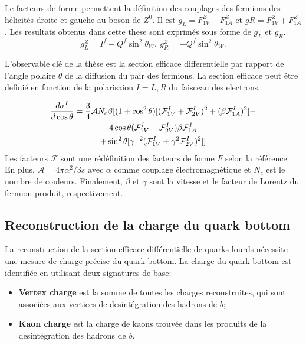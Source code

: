 Le facteurs de forme permettent la définition des couplages des fermions des hélicités droite et gauche au boson de $Z^0$. Il est $g_L = F^Z_{1V} - F^Z_{1A}$  et $gR = F^Z_{1V} + F^Z_{1A}$.
Les resultats obtenus dans cette these sont exprimés sous forme de $g_L$ et $g_R$.  
\begin{equation}
g_L^Z = I^f - Q^f\sin^2\theta_W, \  g_R^Z = -Q^f\sin^2\theta_W.
\label{formula:EWcouplings_3F}
\end{equation}

L'observable clé de la thèse est la section efficace differentielle par rapport de l'angle polaire $\theta$ de la diffusion du pair des fermions. La section efficace peut être definié en fonction de la polarisaion $I=L, R$ du faisceau des electrons.    

\begin{multline}
\label{formula:DiffSigma_3F}
\frac{d\sigma^I}{d\cos\theta} = \frac{3}{4} \mathcal{A} N_c \beta[ (1+\cos^2\theta) [(\mathcal{F}^I_{1V}+\mathcal{F}^I_{2V})^2+(\beta \mathcal{F}^I_{1A})^2] - \\-4 \cos\theta (\mathcal{F}^I_{1V}+\mathcal{F}^I_{2V})\beta \mathcal{F}^I_{1A} +\\+ \sin^2\theta [\gamma ^{-2} (\mathcal{F}^I_{1V} +\gamma^2 \mathcal{F}^I_{2V})^2] ]
\end{multline}
Les facteurs $\mathcal{F}$ sont une rédéfinition des facteurs de forme $F$ selon la référence~\cite{bib:Schmidt}
En plus, $\mathcal{A} = 4\pi\alpha^2/3s$ avec $\alpha$ comme couplage électromagnétique et $N_c$ est le nombre de couleurs. Finalement, $\beta$ et $\gamma$ sont la vitesse et le facteur de Lorentz du fermion produit, respectivement.

\newpage
\subsection*{Reconstruction de la charge du quark bottom}
La reconstruction de la section efficace différentielle de quarks lourds nécessite une mesure de charge précise du quark bottom.
La charge du quark bottom est identifiée en utilisant deux signatures de base:
\begin{itemize}
	\item \textbf{Vertex charge} est la somme de toutes les charges reconstruites, qui sont associées aux vertices de desintégration des hadrons de $b$;
	\item \textbf{Kaon charge} est la charge de kaons trouvée dans les produits de la desintégration des hadrons de $b$. 
\end{itemize}


